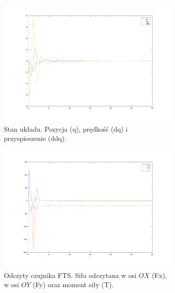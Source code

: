 \documentclass[a4paper, 10pt]{article}
\begin{document}
\begin{figure}
	\centering
	\begin{subfigure}{.5\textwidth}
		\centering
		\includegraphics[width=\linewidth]{mrozenie_p}
		\caption{Stan układu. Pozycja (q), prędkość (dq) i przyspieszenie (ddq).}
		\label{fig:mrozenie_p}
	\end{subfigure}%
	\begin{subfigure}{.5\textwidth}
		\centering
		\includegraphics[width=\linewidth]{mrozenie_s}
		\caption{Odczyty czujnika FTS. Siła odczytana w osi $OX$ (Fx), w osi $OY$ (Fy) oraz moment siły (T).}
		\label{fig:mrozenie_s}
	\end{subfigure}
	\begin{subfigure}{.5\textwidth}
		\centering

\end{subfigure}
\end{figure}
\end{document}

